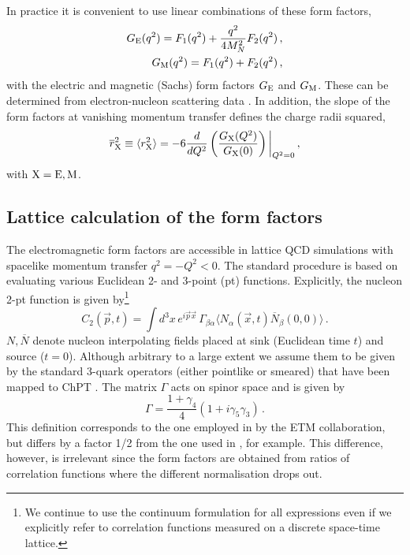 \documentclass[11pt,prd,aps,showpacs,eqsecnum,floatfix,nofootinbib,preprint,tightenlines]{revtex4}
\newcommand{\GE}{G_{\rm E}}
\newcommand{\GM}{G_{\rm M}}
\begin{document}
In practice it is convenient to use linear combinations of these form factors,
\begin{eqnarray}
\GE(q^2)=F_1(q^2) + \frac{q^2}{4M_N^2}F_2(q^2)\,,\label{SachsFFGE}\\
\GM(q^2)=F_1(q^2)+F_2(q^2)\,,\label{SachsFFGM}
\end{eqnarray}
with the electric and magnetic (Sachs) form factors $\GE$ and $\GM$. These can be determined from electron-nucleon scattering data \cite{Punjabi:2015bba}. In addition, the slope of the form factors at vanishing momentum transfer defines the charge radii squared, 
\begin{eqnarray}\label{DefRadii}
\overline{r}^2_{\rm X}\equiv \langle r_{\rm X}^2\rangle = -6 \frac{d}{d Q^2} \left(\frac{G_{\rm X}(Q^2)}{G_{\rm X}(0)}\right)\bigg|_{Q^2=0}\,,
\end{eqnarray}
with ${\rm X=E,M}$.

\subsection{Lattice calculation of the form factors}
The electromagnetic form factors are accessible in lattice QCD simulations with spacelike momentum transfer $q^2=-Q^2 <0$. 
The standard procedure is based on evaluating various Euclidean 2- and 3-point (pt) functions. Explicitly, the nucleon 2-pt function is given by\footnote{We continue to use the continuum formulation for all expressions even if we explicitly refer to correlation functions measured on a discrete space-time lattice.}
\begin{equation}\label{Def:2ptfunc}
C_2(\vec{p},t)= \int d^3x \,e^{i\vec{p}\vec{x}}\, \Gamma_{\beta\alpha}\langle N_{\alpha}(\vec{x},t)\overline{N}_{\beta}(0,0)\rangle \,.
\end{equation}
$N,\overline{N}$ denote nucleon interpolating fields placed at sink (Euclidean time $t$) and source ($t=0$). Although arbitrary to a large extent we assume them to be given by the standard 3-quark operators (either pointlike or smeared) that have been mapped to ChPT \cite{Bar:2015zwa}. The matrix $\Gamma$ acts on spinor space and is given by
\begin{equation}\label{DefProjGamma}
\Gamma=\frac{1+\gamma_4}{4}(1+i \gamma_5\gamma_3)\,.
\end{equation}
This definition corresponds to the one employed in \cite{Alexandrou:2017hac} by the ETM collaboration, but differs by a factor 1/2 from the one used in \cite{Capitani:2017qpc}, for example. 
This difference, however, is irrelevant since the form factors are obtained from ratios of correlation functions where the different normalisation drops out.
\end{document}

